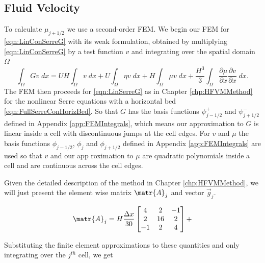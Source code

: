 \subsection{Fluid Velocity}
To calculate $\mu_{j+1/2}$ we use a second-order FEM. We begin our FEM for \eqref{eqn:LinConSerreG} with its weak formulation, obtained by multiplying \eqref{eqn:LinConSerreG} by a test function $v$ and integrating over the spatial domain $\Omega$
\begin{equation*}
\int_{\Omega}G v \; dx = UH\int_{\Omega} v \; dx + U \int_{\Omega} \eta v \; dx +   H\int_{\Omega} \mu v \; dx  + \frac{H^3}{3} \int_{\Omega} \frac{\partial \mu}{\partial x } \frac{\partial v}{\partial x }\; dx.
\end{equation*}
The FEM then proceeds for \eqref{eqn:LinSerreG} as in Chapter \ref{chp:HFVMMethod} for the nonlinear Serre equations with a horizontal bed \eqref{eqn:FullSerreConHorizBed}. So that $G$ has the basis functions $\psi^+_{j - 1/2}$ and $\psi^-_{j + 1/2}$ defined in Appendix \ref{app:FEMIntegrals}, which means our approximation to $G$ is linear inside a cell with discontinuous jumps at the cell edges. For $v$ and $\mu$ the basis functions $\phi_{j-1/2}$, $\phi_{j}$ and $\phi_{j+1/2}$ defined in Appendix \ref{app:FEMIntegrals} are used so that $v$ and our app roximation to $\mu$ are quadratic polynomials inside a cell and are continuous across the cell edges.

Given the detailed description of the method in Chapter \ref{chp:HFVMMethod}, we will just present the element wise matrix $\matr{A}_j$ and vector $\vec{g}_j$. 

\begin{equation}
\matr{A}_j = H \frac{\Delta x}{30 } \begin{bmatrix} 4 &2 &-1 \\2 &16 &2  \\-1 &2 &4 \end{bmatrix} + 
\end{equation}

Substituting the finite element approximations to these quantities and only integrating over the $j^{th}$ cell, we get

